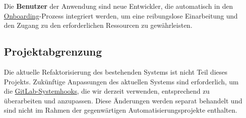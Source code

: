 Die \textbf{Benutzer} der Anwendung sind neue Entwickler, die automatisch in den \hyperlink{Onboarding}{\textcolor{AOBlau}{Onboarding}}-Prozess integriert werden, um eine reibungslose Einarbeitung und den Zugang zu den erforderlichen Ressourcen zu gewährleisten.

\subsection{Projektabgrenzung} 
\label{sec:Projektabgrenzung}

Die aktuelle Refaktorisierung des bestehenden Systems ist nicht Teil dieses Projekts. Zukünftige Anpassungen des aktuellen Systems sind erforderlich, um die \hyperlink{GitLabSystemhooks}{\textcolor{AOBlau}{GitLab-Systemhooks}}, die wir derzeit verwenden, entsprechend zu überarbeiten und anzupassen. Diese Änderungen werden separat behandelt und sind nicht im Rahmen der gegenwärtigen Automatisierungsprojekte enthalten.
